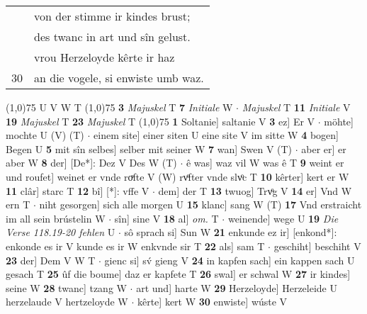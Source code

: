 \documentclass[8pt,a4paper,notitlepage]{article}
\begin{document}
\begin{table}[ht]
\begin{minipage}[t]{0.5\linewidth}
\begin{tabular}{rl}
 & von der stimme ir kindes brust;\\ 
 & des twanc in art und sîn gelust.\\ 
 & vrou Herzeloyde kêrte ir haz\\ 
30 & an die vogele, si enwiste umb waz.\\ 
\end{tabular}
\scriptsize
\line(1,0){75} \newline
U V W T \newline
\line(1,0){75} \newline
\textbf{3} \textit{Majuskel} T  \textbf{7} \textit{Initiale} W   $\cdot$ \textit{Majuskel} T  \textbf{11} \textit{Initiale} V  \textbf{19} \textit{Majuskel} T  \textbf{23} \textit{Majuskel} T  \newline
\line(1,0){75} \newline
\textbf{1} Soltanie] saltanie V \textbf{3} ez] Er V  $\cdot$ möhte] mochte U (V) (T)  $\cdot$ einem site] einer siten U eine site V im sitte W \textbf{4} bogen] Begen U \textbf{5} mit sîn selbes] selber mit seiner W \textbf{7} wan] Swen V (T)  $\cdot$ aber er] er aber W \textbf{8} der] [De*]: Dez V Des W (T)  $\cdot$ ê was] waz vil W was ê T \textbf{9} weint er und roufet] weinet er vnde roͮfte V (W) rvͦfter vnde slvͦc T \textbf{10} kêrter] kert er W \textbf{11} clâr] starc T \textbf{12} bî] [*]: vffe V  $\cdot$ dem] der T \textbf{13} twuog] Trvͦg V \textbf{14} er] Vnd W ern T  $\cdot$ niht gesorgen] sich alle morgen U \textbf{15} klanc] sang W (T) \textbf{17} Vnd erstraicht im all sein brústelin W  $\cdot$ sîn] sine V \textbf{18} al] \textit{om.} T  $\cdot$ weinende] wege U \textbf{19} \textit{Die Verse 118.19-20 fehlen} U   $\cdot$ sô sprach si] Sun W \textbf{21} enkunde ez ir] [enkond*]: enkonde es ir V kunde es ir W enkvnde sir T \textbf{22} als] sam T  $\cdot$ geschiht] beschiht V \textbf{23} der] Dem V W T  $\cdot$ gienc si] sv́ gieng V \textbf{24} in kapfen sach] ein kappen sach U gesach T \textbf{25} ûf die boume] daz er kapfete T \textbf{26} swal] er schwal W \textbf{27} ir kindes] seine W \textbf{28} twanc] tzang W  $\cdot$ art und] harte W \textbf{29} Herzeloyde] Herzeleide U herzelaude V hertzeloyde W  $\cdot$ kêrte] kert W \textbf{30} enwiste] wúste V \newline
\end{minipage}
\end{table}
\end{document}
